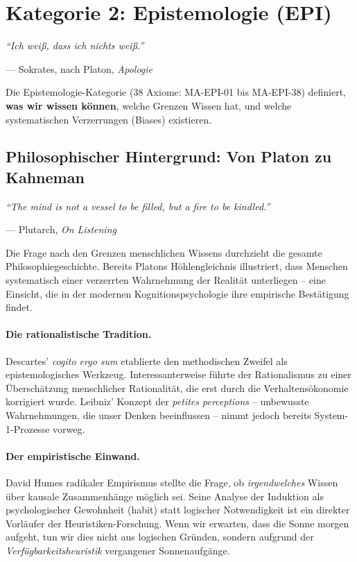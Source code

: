 \section{Kategorie 2: Epistemologie (EPI)}

\epigraph{\textit{``Ich weiß, dass ich nichts weiß.''}}{--- Sokrates, nach Platon, \textit{Apologie}}

Die Epistemologie-Kategorie (38 Axiome: MA-EPI-01 bis MA-EPI-38) definiert, \textbf{was wir wissen können}, welche Grenzen Wissen hat, und welche systematischen Verzerrungen (Biases) existieren.

\subsection{Philosophischer Hintergrund: Von Platon zu Kahneman}

\epigraph{\textit{``The mind is not a vessel to be filled, but a fire to be kindled.''}}{--- Plutarch, \textit{On Listening}}

Die Frage nach den Grenzen menschlichen Wissens durchzieht die gesamte Philosophiegeschichte. Bereits Platons Höhlengleichnis illustriert, dass Menschen systematisch einer verzerrten Wahrnehmung der Realität unterliegen -- eine Einsicht, die in der modernen Kognitionspsychologie ihre empirische Bestätigung findet.

\paragraph{Die rationalistische Tradition.}
Descartes' \textit{cogito ergo sum} etablierte den methodischen Zweifel als epistemologisches Werkzeug. Interessanterweise führte der Rationalismus zu einer Überschätzung menschlicher Rationalität, die erst durch die Verhaltensökonomie korrigiert wurde. Leibniz' Konzept der \textit{petites perceptions} -- unbewusste Wahrnehmungen, die unser Denken beeinflussen -- nimmt jedoch bereits System-1-Prozesse vorweg.

\paragraph{Der empiristische Einwand.}
David Humes radikaler Empirismus stellte die Frage, ob \textit{irgendwelches} Wissen über kausale Zusammenhänge möglich sei. Seine Analyse der Induktion als psychologischer Gewohnheit (habit) statt logischer Notwendigkeit ist ein direkter Vorläufer der Heuristiken-Forschung. Wenn wir erwarten, dass die Sonne morgen aufgeht, tun wir dies nicht aus logischen Gründen, sondern aufgrund der \textit{Verfügbarkeitsheuristik} vergangener Sonnenaufgänge.

